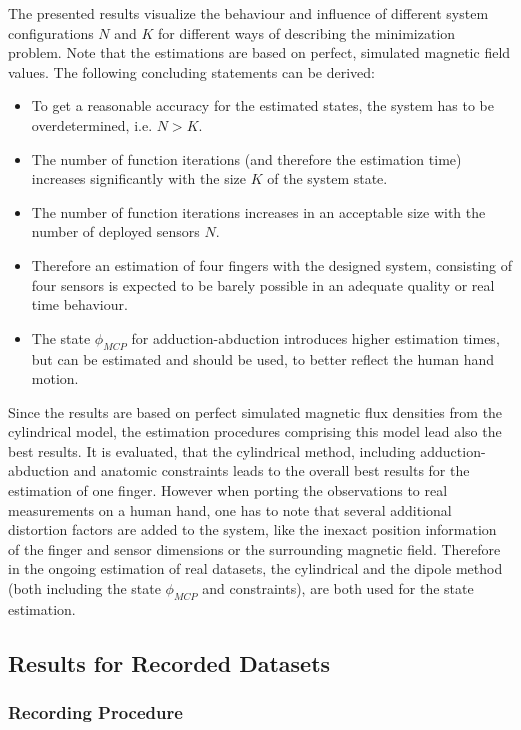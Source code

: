 The presented results visualize the behaviour and influence of different system configurations $ N $ and $ K $ for different ways of describing the minimization problem. Note that the estimations are based on perfect, simulated magnetic field values. The following concluding statements can be derived:
\begin{itemize}
\item To get a reasonable accuracy for the estimated states, the system has to be overdetermined, i.e. $ N > K $.
\item The number of function iterations (and therefore the estimation time) increases significantly with the size $ K $ of the system state.
\item The number of function iterations increases in an acceptable size with the number of deployed sensors $ N $.
\item Therefore an estimation of four fingers with the designed system, consisting of four sensors is expected to be barely possible in an adequate quality or real time behaviour.
\item The state $ \phi_{MCP} $ for adduction-abduction introduces higher estimation times, but can be estimated and should be used, to better reflect the human hand motion.
\end{itemize}
Since the results are based on perfect simulated magnetic flux densities from the cylindrical model, the estimation procedures comprising this model lead also the best results. It is evaluated, that the cylindrical method, including adduction-abduction and anatomic constraints leads to the overall best results for the estimation of one finger. However when porting the observations to real measurements on a human hand, one has to note that several additional distortion factors are added to the system, like the inexact position information of the finger and sensor dimensions or the surrounding magnetic field. Therefore in the ongoing estimation of real datasets, the cylindrical and the dipole method (both including the state $ \phi_{MCP} $ and constraints), are both used for the state estimation.


\subsection{Results for Recorded Datasets} \label{subsec:resMeas}

\subsubsection{Recording Procedure}\label{subsubsec:recSetup}

